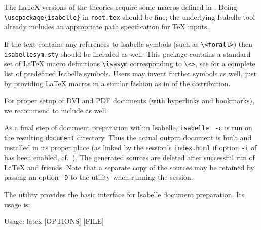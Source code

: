\begin{isabellebody}
\begin{isamarkuptext}
  The {\LaTeX} versions of the theories require some macros defined in
  \hyperlink{file.~~/lib/texinputs/isabelle.sty}{\mbox{}}.  Doing \verb|\usepackage{isabelle}| in \verb|root.tex| should be fine;
  the underlying Isabelle \hyperlink{tool.latex}{\mbox{}} tool already includes an
  appropriate path specification for {\TeX} inputs.

  If the text contains any references to Isabelle symbols (such as
  \verb|\|\verb|<forall>|) then \verb|isabellesym.sty| should be included as well.  This package
  contains a standard set of {\LaTeX} macro definitions \verb|\isasym| corresponding to \verb|\|\verb|<|\verb|>|, see \cite{isabelle-implementation} for a
  complete list of predefined Isabelle symbols.  Users may invent
  further symbols as well, just by providing {\LaTeX} macros in a
  similar fashion as in \hyperlink{file.~~/lib/texinputs/isabellesym.sty}{\mbox{}} of
  the distribution.

  For proper setup of DVI and PDF documents (with hyperlinks and
  bookmarks), we recommend to include \hyperlink{file.~~/lib/texinputs/pdfsetup.sty}{\mbox{}} as well.

  \medskip As a final step of document preparation within Isabelle,
  \verb|isabelle| \hyperlink{tool.document}{\mbox{}}~\verb|-c| is run on the
  resulting \verb|document| directory.  Thus the actual output
  document is built and installed in its proper place (as linked by
  the session's \verb|index.html| if option \verb|-i| of
  \hyperlink{tool.usedir}{\mbox{}} has been enabled, cf.\ ).  The
  generated sources are deleted after successful run of {\LaTeX} and
  friends.  Note that a separate copy of the sources may be retained
  by passing an option \verb|-D| to the \hyperlink{tool.usedir}{\mbox{}} utility
  when running the session.%
\end{isamarkuptext}%
\isamarkuptrue%
%
\isamarkuptrue%
%
\begin{isamarkuptext}%
The \hypertarget{tool.latex}{\hyperlink{tool.latex}{\mbox{}}} utility provides the basic interface for
  Isabelle document preparation.  Its usage is:
\begin{ttbox}
Usage: latex [OPTIONS] [FILE]


\end{ttbox}
\end{isamarkuptext}
\end{isabellebody}
